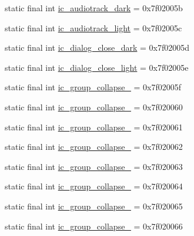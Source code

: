 \begin{CompactItemize}
\item 
static final int \hyperlink{classandroid_1_1support_1_1graphics_1_1drawable_1_1animated_1_1_r_1_1drawable_e398d2f66405aacd43de49a20f640ffd}{ic\_\-audiotrack\_\-dark} = 0x7f02005b
\item 
static final int \hyperlink{classandroid_1_1support_1_1graphics_1_1drawable_1_1animated_1_1_r_1_1drawable_399fe9ebe61251ec6d04d9e479687314}{ic\_\-audiotrack\_\-light} = 0x7f02005c
\item 
static final int \hyperlink{classandroid_1_1support_1_1graphics_1_1drawable_1_1animated_1_1_r_1_1drawable_ce13d88a0532b6788e970683176f2fe3}{ic\_\-dialog\_\-close\_\-dark} = 0x7f02005d
\item 
static final int \hyperlink{classandroid_1_1support_1_1graphics_1_1drawable_1_1animated_1_1_r_1_1drawable_5c53e907c8bd3ee768e8767192eaaae0}{ic\_\-dialog\_\-close\_\-light} = 0x7f02005e
\item 
static final int \hyperlink{classandroid_1_1support_1_1graphics_1_1drawable_1_1animated_1_1_r_1_1drawable_852161230dcca4d1379b26eb0d609e6f}{ic\_\-group\_\-collapse\_} = 0x7f02005f
\item 
static final int \hyperlink{classandroid_1_1support_1_1graphics_1_1drawable_1_1animated_1_1_r_1_1drawable_741a61e639305d5ff7f1ef353e7170f8}{ic\_\-group\_\-collapse\_} = 0x7f020060
\item 
static final int \hyperlink{classandroid_1_1support_1_1graphics_1_1drawable_1_1animated_1_1_r_1_1drawable_80d776c3dbf09c109388f06a6aacafe1}{ic\_\-group\_\-collapse\_} = 0x7f020061
\item 
static final int \hyperlink{classandroid_1_1support_1_1graphics_1_1drawable_1_1animated_1_1_r_1_1drawable_ecca03e087a0de4f80910a4bb099e1d9}{ic\_\-group\_\-collapse\_} = 0x7f020062
\item 
static final int \hyperlink{classandroid_1_1support_1_1graphics_1_1drawable_1_1animated_1_1_r_1_1drawable_cdbada8c0c64d71da7258c6fc9bf7819}{ic\_\-group\_\-collapse\_} = 0x7f020063
\item 
static final int \hyperlink{classandroid_1_1support_1_1graphics_1_1drawable_1_1animated_1_1_r_1_1drawable_27a30255e57c7ab2fab1d68f50782f19}{ic\_\-group\_\-collapse\_} = 0x7f020064
\item 
static final int \hyperlink{classandroid_1_1support_1_1graphics_1_1drawable_1_1animated_1_1_r_1_1drawable_7da84f4a599493beefb7e06ab2335208}{ic\_\-group\_\-collapse\_} = 0x7f020065
\item 
static final int \hyperlink{classandroid_1_1support_1_1graphics_1_1drawable_1_1animated_1_1_r_1_1drawable_b4ce9afe10252cec075ee1ce77910aab}{ic\_\-group\_\-collapse\_} = 0x7f020066

\end{CompactItemize}
